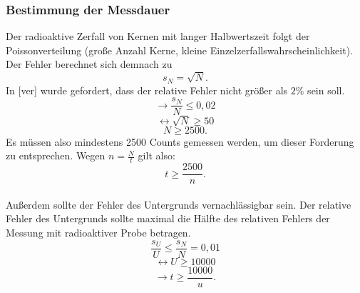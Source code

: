   \subsubsection{Bestimmung der Messdauer}
  Der radioaktive Zerfall von Kernen mit langer Halbwertszeit folgt der Poissonverteilung (große Anzahl Kerne, kleine Einzelzerfallswahrscheinlichkeit). Der Fehler berechnet sich demnach zu \[s_{N}=\sqrt{N}.\] In [ver] wurde gefordert, dass der relative Fehler nicht größer als $2\%$ sein soll. \[\rightarrow \frac{s_{N}}{N}\leq 0,02\] \[\leftrightarrow \sqrt{N}\geq 50\] \[N \geq 2500.\] Es müssen also mindestens 2500 Counts gemessen werden, um dieser Forderung zu entsprechen. Wegen $n=\frac{N}{t}$ gilt also: \[t\geq\frac{2500}{n}.\]\\
  Außerdem sollte der Fehler des Untergrunds vernachlässigbar sein. Der relative Fehler des Untergrunds sollte maximal die Hälfte des relativen Fehlers der Messung mit radioaktiver Probe betragen. \[\frac{s_{U}}{U}\leq\frac{s_{N}}{N}=0,01\]\[\leftrightarrow U\geq10000\]\[\rightarrow t\geq\frac{10000}{u}.\]